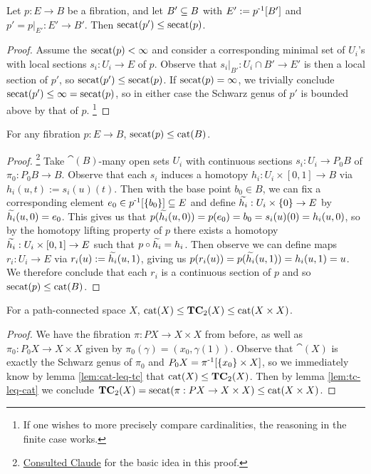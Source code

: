 \begin{lemma}\label{lem:subsecat-leq-secat}
    Let $p : E \to B$ be a fibration, and let $B' \sub B$ with $E' := \inv{p}[B']$ and $p' = p |_{E'} : E' \to B'$.
    Then $\secat(p') \leq \secat(p)$.
    \begin{proof}
        Assume the $\secat(p) < \infty$ and consider a corresponding minimal set of $U_i$'s with local sections $s_i : U_i \to E$ of $p$.
        Observe that $s_i |_{B'} : U_i \cap B' \to E'$ is then a local section of $p'$, so $\secat(p') \leq \secat(p)$.
        If $\secat(p) = \infty$, we trivially conclude $\secat(p') \leq \infty = \secat(p)$, so in either case the Schwarz genus of $p'$ is bounded above by that of $p$.
        \footnote{If one wishes to more precisely compare cardinalities, the reasoning in the finite case works.}
    \end{proof}
\end{lemma}

\begin{lemma}\label{lem:tc-leq-cat}
    For any fibration $p : E \to B$, $\secat(p) \leq \cat(B)$.
    \begin{proof}
        \footnote{\href{https://claude.ai/share/9dd0d1e1-becf-404d-b7e0-429a453849e8}{Consulted Claude} for the basic idea in this proof.}
        Take $\cat(B)$-many open sets $U_i$ with continuous sections $s_i : U_i \to P_0 B$ of $\pi_0 : P_0 B \to B$.
        Observe that each $s_i$ induces a homotopy $h_i : U_i \times [0,1] \to B$ via $h_i(u,t) := s_i(u)(t)$.
        Then with the base point $b_0 \in B$, we can fix a corresponding element $e_0 \in \inv{p}[\set{b_0}] \sub E$ and define $\Tilde{h_i} : U_i \times \set{0} \to E$ by $\Tilde{h_i}(u, 0) = e_0$.
        This gives us that $p(\Tilde{h_i}(u,0)) = p(e_0) = b_0 = s_i(u)(0) = h_i(u,0)$, so by the homotopy lifting property of $p$ there exists a homotopy $\Tilde{h_i} : U_i \times [0,1] \to E$ such that $p \circ \Tilde{h_i} = h_i$.
        Then observe we can define maps $r_i : U_i \to E$ via $r_i(u) := \Tilde{h_i}(u,1)$, giving us $p(r_i(u)) = p(\Tilde{h_i}(u,1)) = h_i(u,1) = u$.
        We therefore conclude that each $r_i$ is a continuous section of $p$ and so $\secat(p) \leq \cat(B)$.
    \end{proof}
\end{lemma}

\begin{proposition}
    For a path-connected space $X$, $\cat(X) \leq \TC_2(X) \leq \cat(X \times X)$.
    \begin{proof}
        We have the fibration $\pi : PX \to X \times X$ from before, as well as $\pi_0 : P_0X \to X \times X$ given by $\pi_0(\gamma) = (x_0,\gamma(1))$.
        Observe that $\cat(X)$ is exactly the Schwarz genus of $\pi_0$ and $P_0X = \inv{\pi}[\set{x_0} \times X]$, so we immediately know by lemma \ref{lem:cat-leq-tc} that $\cat(X) \leq \TC_2(X)$.
        Then by lemma \ref{lem:tc-leq-cat} we conclude $\TC_2(X) = \secat(\pi : PX \to X \times X) \leq \cat(X \times X)$.
    \end{proof}
\end{proposition}

